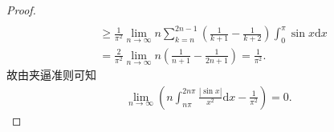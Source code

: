 \documentclass[../../main.tex]{subfiles}
\begin{document}
\begin{proof}
\begin{align*}
\\
&\geq \frac{1}{\pi^2} \lim_{n \to \infty} n \sum_{k=n}^{2n - 1} \left( \frac{1}{k + 1} - \frac{1}{k + 2} \right) \int_0^{\pi} \sin x \mathrm{d}x \\
&= \frac{2}{\pi^2} \lim_{n \to \infty} n \left( \frac{1}{n + 1} - \frac{1}{2n + 1} \right) = \frac{1}{\pi^2}.
\end{align*}
故由夹逼准则可知
\begin{align*}
\lim_{n \to \infty} \left( n \int_{n\pi}^{2n\pi} \frac{|\sin x|}{x^2} \mathrm{d}x - \frac{1}{\pi^2} \right) = 0.
\end{align*}
\end{proof}
\end{document}
